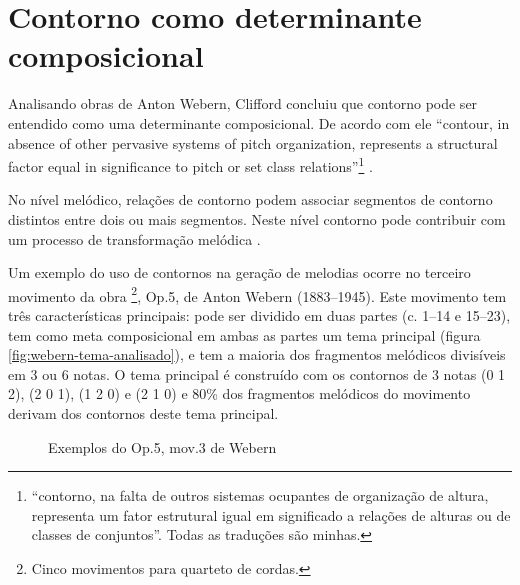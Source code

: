 \section{Contorno como determinante composicional}
\label{sec:cont-como-determ}

Analisando obras de Anton Webern, Clifford concluiu que contorno pode
ser entendido como uma determinante composicional. De acordo com ele
``contour, in absence of other pervasive systems of pitch
organization, represents a structural factor equal in significance to
pitch or set class relations''\footnote{``contorno, na falta de outros
  sistemas ocupantes de organização de altura, representa um fator
  estrutural igual em significado a relações de alturas ou de classes
  de conjuntos''. Todas as traduções são
  minhas.} \cite[p. 157]{clifford95:contour}.

No nível melódico, relações de contorno podem associar segmentos de
contorno distintos entre dois ou mais segmentos. Neste nível contorno
pode contribuir com um processo de transformação melódica
\cite[p. 159]{clifford95:contour}.

Um exemplo do uso de contornos na geração de melodias ocorre no
terceiro movimento da obra \footnote{Cinco movimentos para quarteto de
  cordas.}, Op.5, de Anton Webern (1883--1945). Este movimento tem
três características principais: pode ser dividido em duas partes
(c. 1--14 e 15--23), tem como meta composicional em ambas as partes um
tema principal (figura \ref{fig:webern-tema-analisado}), e tem a
maioria dos fragmentos melódicos divisíveis em 3 ou 6 notas. O tema
principal é construído com os contornos de 3 notas (0 1 2), (2 0 1),
(1 2 0) e (2 1 0) e 80\% dos fragmentos melódicos do movimento derivam
dos contornos deste tema principal.

\begin{figure}
  \centering

  \quad
  \caption{Exemplos do Op.5, mov.3 de Webern}
  \label{fig:exemplos-webern}
\end{figure}

